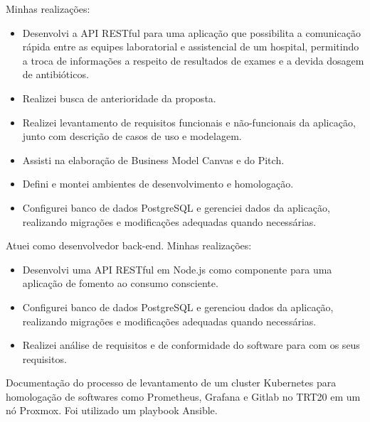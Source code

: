 \documentclass[10pt,a4paper,ragged2e,withhyper]{altacv}
\begin{document}
\begin{paracol}{2}
Minhas realizações:
\begin{itemize}
\item Desenvolvi a API RESTful para uma aplicação que possibilita a comunicação rápida entre as equipes laboratorial e assistencial de um hospital, permitindo a troca de informações a respeito de resultados de exames e a devida dosagem de antibióticos.
\item Realizei busca de anterioridade da proposta.
\item Realizei levantamento de requisitos funcionais e não-funcionais da aplicação, junto com descrição de casos de uso e modelagem.
\item Assisti na elaboração de Business Model Canvas e do Pitch.
\item Defini e montei ambientes de desenvolvimento e homologação.
\item Configurei banco de dados PostgreSQL e gerenciei dados da aplicação, realizando migrações e modificações adequadas quando necessárias.
\end{itemize}


\newpage

\par\divider
{}

Atuei como desenvolvedor back-end. Minhas realizações:
\begin{itemize}
\item Desenvolvi uma API RESTful em Node.js como componente para uma aplicação de fomento ao consumo consciente.
\item Configurei banco de dados PostgreSQL e gerenciou dados da aplicação, realizando migrações e modificações adequadas quando necessárias.
\item Realizei análise de requisitos e de conformidade do software para com os seus requisitos.
\end{itemize}

\newpage
\switchcolumn
{}
\label{sec:org442a22c}

Documentação do processo de levantamento de um cluster Kubernetes para homologação de softwares como Prometheus, Grafana e Gitlab no TRT20 em um nó Proxmox.
Foi utilizado um playbook Ansible.


\end{paracol}
\end{document}
